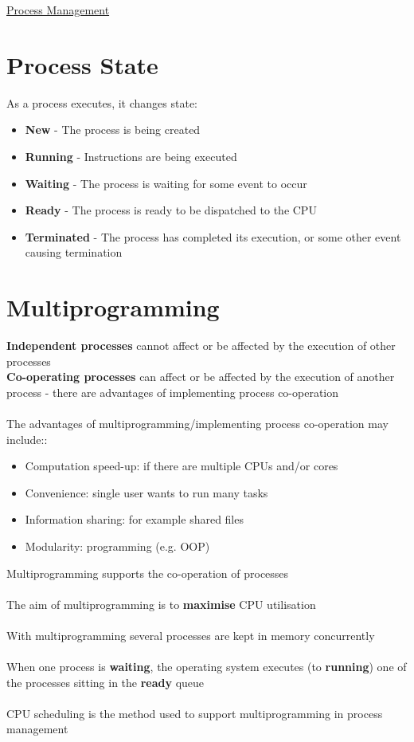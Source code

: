 \documentclass{article}[18pt]
\begin{document}
\begin{center}
\underline{\huge Process Management}
\end{center}
\section{Process State}
As a process executes, it changes state:
\begin{itemize}
\item \textbf{New} - The process is being created
\item \textbf{Running} - Instructions are being executed
\item \textbf{Waiting} - The process is waiting for some event to occur
\item \textbf{Ready} - The process is ready to be dispatched to the CPU
\item \textbf{Terminated} - The process has completed its execution, or some other event causing termination
\end{itemize}
\section{Multiprogramming}
\textbf{Independent processes} cannot affect or be affected by the execution of other processes\\
\textbf{Co-operating processes} can affect or be affected by the execution of another process - there are advantages of implementing process co-operation\\
\\
The advantages of multiprogramming/implementing process co-operation may include::
\begin{itemize}
\item Computation speed-up: if there are multiple CPUs and/or cores
\item Convenience: single user wants to run many tasks
\item Information sharing: for example shared files
\item Modularity: programming (e.g. OOP)
\end{itemize}
Multiprogramming supports the co-operation of processes\\
\\
The aim of multiprogramming is to \textbf{maximise} CPU utilisation\\
\\
With multiprogramming several processes are kept in memory concurrently\\
\\
When one process is \textbf{waiting}, the operating system executes (to \textbf{running}) one of the processes sitting in the \textbf{ready} queue\\
\\
CPU scheduling is the method used to support multiprogramming in process management
\end{document}
